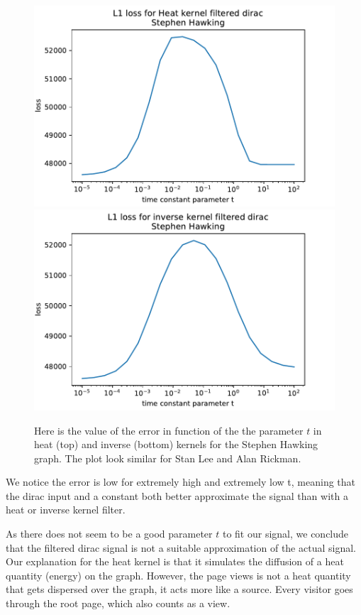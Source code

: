 \documentclass[conference]{IEEEtran}
\begin{document}
\begin{figure}[!htb]
\includegraphics[width=\linewidth]{heat_loss.pdf}
\includegraphics[width=\linewidth]{inverse_loss.pdf}
\caption{Here is the value of the error in function of the the parameter $t$ in heat (top) and inverse (bottom) kernels for the Stephen Hawking graph. The plot look similar for Stan Lee and Alan Rickman. } 
\end{figure}

We notice the error is low for extremely high and extremely low t, meaning that
the dirac input and a constant both better approximate the signal than with a heat or inverse kernel filter.

\medskip

As there does not seem to be a good parameter $t$ to fit our signal, we conclude that the filtered dirac signal is not a suitable approximation of the actual signal. Our explanation for the heat kernel is that it simulates the diffusion of a heat quantity (energy) on the graph. However, the page views is not a heat quantity that gets dispersed over the graph, it acts more like a source. Every visitor goes through the root page, which also counts as a view.
\end{document}
